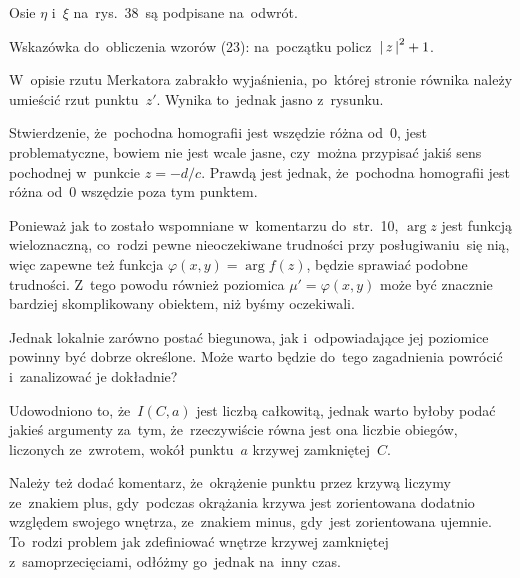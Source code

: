 \documentclass[a4paper,11pt]{article}
\begin{document}
\vspace{\spaceFour}


\start {} Osie $\eta$ i~$\xi$ na~rys.~38~są podpisane na~odwrót.

\vspace{\spaceFour}


\start {} Wskazówka do~obliczenia wzorów (23): na~początku
policz~$\left| \,  z  \, \right|^{ 2 } + 1$.

\vspace{\spaceFour}


\start {} W~opisie rzutu Merkatora zabrakło wyjaśnienia,
po~której stronie równika należy umieścić rzut punktu~$z'$. Wynika
to~jednak jasno z~rysunku.

\vspace{\spaceFour}


\start {} Stwierdzenie, że~pochodna homografii jest wszędzie
różna od~0, jest problematyczne, bowiem nie jest wcale jasne,
czy~można przypisać jakiś sens pochodnej w~punkcie $z = -d / c$.
Prawdą jest jednak, że~pochodna homografii jest różna od~0 wszędzie
poza tym punktem.

\vspace{\spaceFour}


\start {} Ponieważ jak to zostało wspomniane w~komentarzu
do~str.~10, $\arg z$ jest funkcją wieloznaczną, co~rodzi pewne
nieoczekiwane trudności przy posługiwaniu~się nią, więc zapewne też
funkcja $\varphi( x, y ) = \arg f( z )$, będzie sprawiać podobne
trudności. Z~tego powodu również poziomica $\mu' = \varphi( x, y )$ może
być znacznie bardziej skomplikowany obiektem, niż byśmy oczekiwali.

Jednak lokalnie zarówno postać biegunowa, jak i~odpowiadające jej
poziomice powinny być dobrze określone. Może warto będzie do~tego
zagadnienia powrócić i~zanalizować je dokładnie?

\vspace{\spaceFour}


\start {} Udowodniono to, że~$I( C, a )$ jest liczbą
całkowitą, jednak warto byłoby podać jakieś argumenty za~tym,
że~rzeczywiście równa jest ona liczbie obiegów, liczonych ze~zwrotem,
wokół punktu~$a$ krzywej zamkniętej~$C$.

Należy też dodać komentarz, że~okrążenie punktu przez krzywą liczymy
ze~znakiem plus, gdy~podczas okrążania krzywa jest zorientowana
dodatnio względem swojego wnętrza, ze~znakiem minus, gdy~jest
zorientowana ujemnie. To~rodzi problem jak zdefiniować wnętrze krzywej
zamkniętej z~samoprzecięciami, odłóżmy go~jednak na~inny czas.
\end{document}
